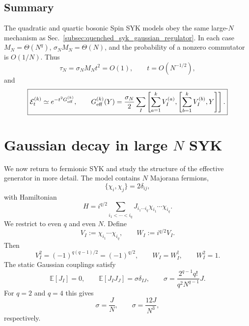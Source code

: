 \documentclass{article}
\theoremstyle{definition}
\begin{document}
\subsection{Summary}

The quadratic and quartic bosonic Spin SYK models obey the same large-$N$
mechanism as Sec.~\ref{subsec:quenched_syk_gaussian_regulator}.  In each
case $M_N=\Theta(N^q)$, $\sigma_NM_N=\Theta(N)$, and the probability of a
nonzero commutator is $O(1/N)$.  Thus
\begin{equation}
    \tau_N=\sigma_NM_Nt^2=O(1),
    \qquad
    t=O(N^{-1/2}),
\end{equation}
and
\begin{equation}
    \boxed{
    {\cal E}_t^{(k)}\simeq e^{-t^2G_{\rm eff}^{(k)}},
    \qquad
    G_{\rm eff}^{(k)}(Y)
    =\frac{\sigma_N}{2}\sum_I
    \left[
       \sum_{a=1}^kV_I^{(a)},
       \left[\sum_{b=1}^kV_I^{(b)},Y\right]
    \right].
    }
\end{equation}


\section{Gaussian decay in large $N$ SYK}
\label{sec:largeN_SYK}

We now return to fermionic SYK and study the structure of the effective
generator in more detail.  The model contains $N$ Majorana fermions,
\begin{equation}
    \{\chi_i,\chi_j\}=2\delta_{ij},
\end{equation}
with Hamiltonian
\begin{equation}
    H
    =i^{q/2}\sum_{i_1<\cdots<i_q}
    J_{i_1\cdots i_q}\chi_{i_1}\cdots\chi_{i_q}.
\end{equation}
We restrict to even $q$ and even $N$.  Define
\begin{equation}
    V_I:=\chi_{i_1}\cdots\chi_{i_q},
    \qquad
    W_I:=i^{q/2}V_I.
\end{equation}
Then
\begin{equation}
    V_I^2=(-1)^{q(q-1)/2}=(-1)^{q/2},
    \qquad
    W_I=W_I^\dagger,
    \qquad
    W_I^2=1.
\end{equation}
The static Gaussian couplings satisfy
\begin{equation}
    \mathbb E[J_I]=0,
    \qquad
    \mathbb E[J_IJ_J]=\sigma\delta_{IJ},
    \qquad
    \sigma=\frac{2^{q-1}q!}{q^2N^{q-1}}J.
\end{equation}
For $q=2$ and $q=4$ this gives
\begin{equation}
    \sigma=\frac{J}{N},
    \qquad
    \sigma=\frac{12J}{N^3},
\end{equation}
respectively.
\end{document}

